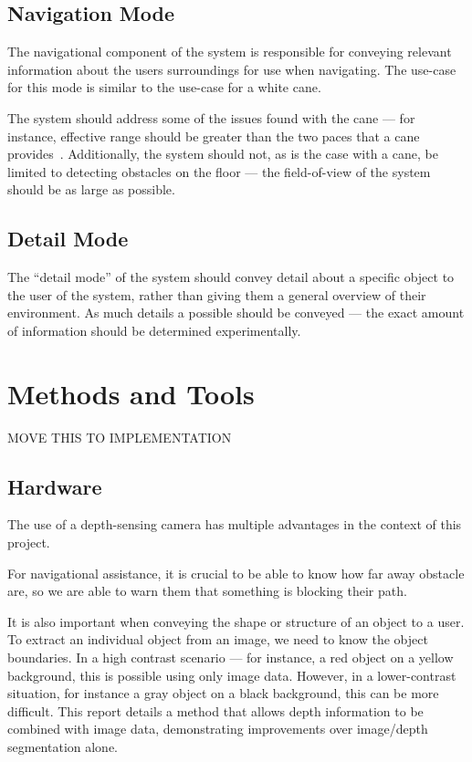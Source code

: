 \subsection{Navigation Mode}
The navigational component of the system is responsible for conveying relevant information about the users surroundings for use when navigating. The use-case for this mode is similar to the use-case for a white cane.

The system should address some of the issues found with the cane --- for instance, effective range should be greater than the two paces that a cane provides~\cite{mobilityenhancement}. Additionally, the system should not, as is the case with a cane, be limited to detecting obstacles on the floor --- the field-of-view of the system should be as large as possible.

\subsection{Detail Mode}
The ``detail mode'' of the system should convey detail about a specific object to the user of the system, rather than giving them a general overview of their environment. As much details a possible should be conveyed --- the exact amount of information should be determined experimentally.

\section{Methods and Tools}
MOVE THIS TO IMPLEMENTATION

\subsection{Hardware}
The use of a depth-sensing camera has multiple advantages in the context of this project.

For navigational assistance, it is crucial to be able to know how far away obstacle are, so we are able to warn them that something is blocking their path.

It is also important when conveying the shape or structure of an object to a user. To extract an individual object from an image, we need to know the object boundaries. In a high contrast scenario --- for instance, a red object on a yellow background, this is possible using only image data. However, in a lower-contrast situation, for instance a gray object on a black background, this can be more difficult. This report details a method that allows depth information to be combined with image data, demonstrating improvements over image/depth segmentation alone. 


